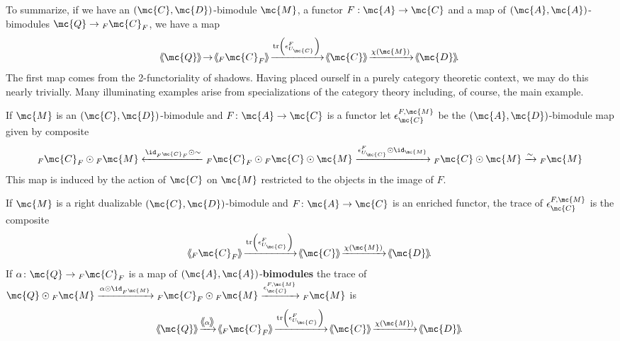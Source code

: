 \documentclass[11pt]{amsart}
\newcommand{\xto}{\xrightarrow}
\DeclareMathOperator{\tr}{tr}
\newcommand{\rbm}[4]{{#1}^{#2}_{#4}} %
\newcommand{\rbmm}[5]{{#1}^{{#2},{#5}}_{{#4}}} %
\def\shvar#1#2{{\ensuremath{%
  \hspace{1mm}\makebox[-1mm]{$#1\langle$}\makebox[0mm]{$#1\langle$}\hspace{1mm}%
  {#2}%
  \makebox[1mm]{$#1\rangle$}\makebox[0mm]{$#1\rangle$}%
}}}
\def\sh{\shvar{}}
\begin{document}
To summarize, if we have an $(\mc{C}, \mc{D})$-bimodule $\mc{M}$, a functor $F: \mc{A} \to \mc{C}$ and a map of $(\mc{A}, \mc{A})$-bimodules $\mc{Q} \to {_F \mc{C}_F}$, we have a map 
\[
\sh{\mc{Q}} \to \sh{_F \mc{C}_F} \xto{\tr\left(\rbm{\epsilon}{F}{\mc{C}}{U_\mc{C}}\right)} \sh{\mc{C}} \xrightarrow{\chi(\mc{M})} \sh{\mc{D}}. 
\]
The first map comes from the 2-functoriality of shadows.   
Having placed ourself in a purely category theoretic context, we may do this nearly trivially. Many illuminating examples arise from specializations of the category theory including, of course, the main example.

\begin{defn}
If $\mc{M}$ is an $(\mc{C},\mc{D})$-bimodule  and $F\colon \mc{A}\to \mc{C}$ is a functor 
let $\rbmm{\epsilon}{F}{\mc{C}}{{\mc{C}}}{\mc{M}}$ be the $(\mc{A},\mc{D})$-bimodule map given by  composite 
\[_F\mc{C}_F\odot {_F\mc{M}}\xleftarrow{\id_{_F\mc{C}_F}\odot \sim } {_F\mc{C}_F}\odot {_F\mc{C}}\odot \mc{M} \xto{\rbm{\epsilon}{F}{\mc{C}}{U_{\mc{C}}}\odot \id_\mc{M}} {_F\mc{C}}\odot \mc{M}
\xto{\sim } {_F\mc{M}}\]
This map is induced by the action of $\mc{C}$ on $\mc{M}$ restricted to the objects in the image of $F$.
\end{defn}


\begin{prop}\label{prop:base_change_euler_monoid}
If $\mc{M}$ is a right dualizable $(\mc{C},\mc{D})$-bimodule  and $F\colon \mc{A}\to \mc{C}$ is an enriched functor, the trace of $\rbmm{\epsilon}{F}{\mc{C}}{{\mc{C}}}{\mc{M}}$ is the composite 
\[\sh{{_F\mc{C}_F}}\xto{\tr\left(\rbm{\epsilon}{F}{\mc{C}}{U_\mc{C}}\right)}
\sh{\mc{C}}\xto{\chi(\mc{M})} \sh{\mc{D}}.\]
If $\alpha \colon \mc{Q}\to {_F\mc{C}_F}$ is a map of $(\mc{A},\mc{A})$-{\bf bimodules} 
 the trace of 
$\mc{Q}\odot {_F\mc{M}}\xto{\alpha \odot \id_{{_F\mc{M}}}}{_F\mc{C}_F}\odot {_F\mc{M}}\xto{\rbmm{\epsilon}{F}{\mc{C}}{{\mc{C}}}{\mc{M}} } 
{_F\mc{M}}$
is 
\[\sh{\mc{Q}}\xto{\sh{\alpha}} \sh{ {_{F}\mc{C}_{F}}}\xto{\tr\left(\rbm{\epsilon}{F}{\mc{C}}{U_\mc{C}}\right)}\sh{\mc{C}}\xto{\chi(\mc{M})} \sh{\mc{D}}. \]
\end{prop}
\end{document}
